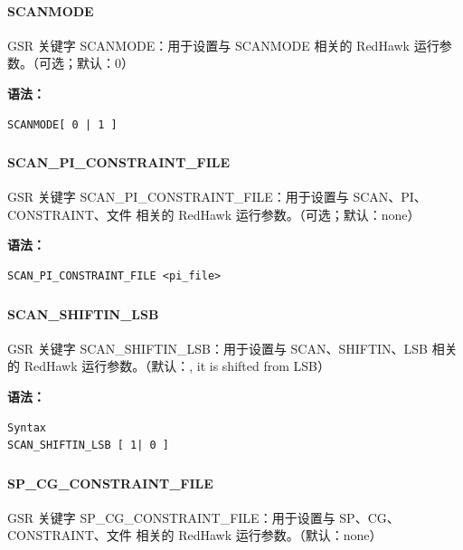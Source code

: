 \paragraph*{SCANMODE}

GSR 关键字 SCANMODE：用于设置与 SCANMODE 相关的 RedHawk 运行参数。（可选；默认：0）

\textbf{语法：}
\begin{lstlisting}
SCANMODE[ 0 | 1 ]
\end{lstlisting}

\subsubsection{}
\paragraph*{SCAN_PI_CONSTRAINT_FILE}

GSR 关键字 SCAN_PI_CONSTRAINT_FILE：用于设置与 SCAN、PI、CONSTRAINT、文件 相关的 RedHawk 运行参数。（可选；默认：none）

\textbf{语法：}
\begin{lstlisting}
SCAN_PI_CONSTRAINT_FILE <pi_file>
\end{lstlisting}

\subsubsection{}
\paragraph*{SCAN_SHIFTIN_LSB}

GSR 关键字 SCAN_SHIFTIN_LSB：用于设置与 SCAN、SHIFTIN、LSB 相关的 RedHawk 运行参数。（默认：, it is shifted from LSB）

\textbf{语法：}
\begin{lstlisting}
Syntax
SCAN_SHIFTIN_LSB [ 1| 0 ]
\end{lstlisting}

\subsubsection{}
\paragraph*{SP_CG_CONSTRAINT_FILE}

GSR 关键字 SP_CG_CONSTRAINT_FILE：用于设置与 SP、CG、CONSTRAINT、文件 相关的 RedHawk 运行参数。（默认：none）

